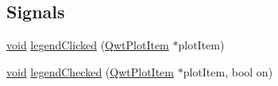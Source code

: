 \subsection*{Signals}
\begin{DoxyCompactItemize}
\item 
\hyperlink{group___u_a_v_objects_plugin_ga444cf2ff3f0ecbe028adce838d373f5c}{void} \hyperlink{class_qwt_plot_a52b75d5548fbe04539b6297de53a2222}{legend\-Clicked} (\hyperlink{class_qwt_plot_item}{Qwt\-Plot\-Item} $\ast$plot\-Item)
\item 
\hyperlink{group___u_a_v_objects_plugin_ga444cf2ff3f0ecbe028adce838d373f5c}{void} \hyperlink{class_qwt_plot_abd9e17629dd7c142fed017ea5e347149}{legend\-Checked} (\hyperlink{class_qwt_plot_item}{Qwt\-Plot\-Item} $\ast$plot\-Item, bool on)
\end{DoxyCompactItemize}
